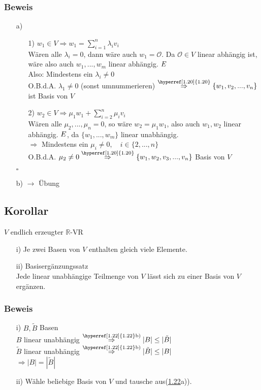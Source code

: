 \documentclass[a4paper, 12pt,titlepage, pdf, headsepline]{article}
\newcommand{\R}{\mathds{R}}
\renewcommand{\>}{\rightarrow}
\renewcommand{\*}{\cdot}
\begin{document}
\subsubsection*{Beweis}
\begin{itemize}
	\item[a)] \begin{itemize}
	\item[1)] $w_1\in V\Rightarrow w_1=\sum_{i=1}^{n}\lambda_iv_i$\\
	      Wären alle $\lambda_i=0$, dann wäre auch $w_1=\mathcal{O}$. Da $\mathcal{O}\in V$ linear abhängig ist, wäre also auch $w_1,...,w_m$ linear abhängig. $\Lightning$\\
	      Also: Mindestens ein $\lambda_i\neq 0$\\
	      O.B.d.A. $\lambda_1\neq 0$ (sonst umnummerieren) $\overset{\textrm{\hyperref[1.20]{1.20}}}{\Rightarrow}\{w_1,v_2,...,v_n\}$ ist Basis von $V$
	\item[2)]  $w_2\in V\Rightarrow \mu_1w_1+\sum_{i=2}^{n}\mu_iv_i$\\
	      Wären alle $\mu_2,...,\mu_n=0$, so wäre $w_2=\mu_1w_1$, also auch $w_1,w_2$ linear abhängig. $\Lightning$, da $\{w_1,...,w_m\}$ linear unabhängig.\\
	      $\Rightarrow$ Mindestens ein $\mu_i\neq 0,\quad i\in\{2,...,n\}$\\
	      O.B.d.A. $\mu_2\neq 0\overset{\textrm{\hyperref[1.20]{1.20}}}{\Rightarrow}\{w_1,w_2,v_3,...,v_n\}$ Basis von $V$
\end{itemize}\hfill$\square$
\item[b)] $\rightarrow$ Übung
\end{itemize}
\subsection{Korollar}
\label{1.23}
$V$ endlich erzeugter $\R$-VR
\begin{itemize}
	\item[i)] Je zwei Basen von $V$ enthalten gleich viele Elemente.
	\item[ii)] Basisergänzungssatz\\
	      Jede linear unabhängige Teilmenge von $V$ lässt sich zu einer Basis von $V$ ergänzen.
\end{itemize}
\subsubsection*{Beweis}
\begin{itemize}
	\item[i)] $B,\tilde{B}$ Basen\\
	      $B$ linear unabhängig $\overset{\textrm{\hyperref[1.22]{1.22}b)}}{\Rightarrow}|B|\leq|\tilde{B}|$\\
	      $\tilde{B}$ linear unabhängig $\overset{\textrm{\hyperref[1.22]{1.22}b)}}{\Rightarrow}|\tilde{B}|\leq|B|$\\
	      $\Rightarrow|B|=|\tilde{B}|$
	\item[ii)] Wähle beliebige Basis von $V$ und tausche aus(\hyperref[1.22]{1.22}a)).
\end{itemize}
\end{document}
